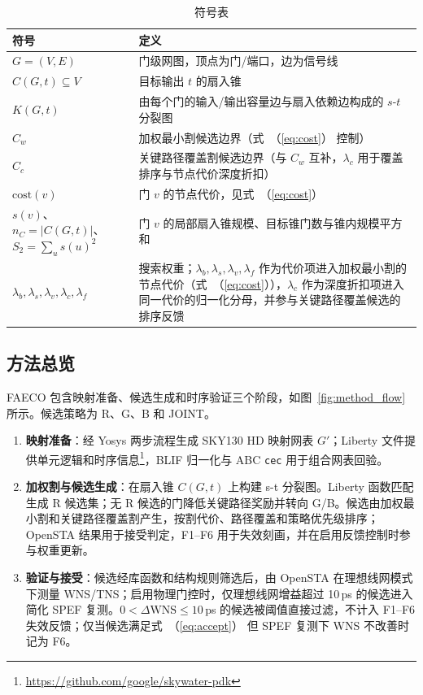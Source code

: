 \documentclass[twocolumn,10pt,fontset=windows]{ctexart}
\renewcommand{\eqref}[1]{\textup{（\ref{#1}）}}
\begin{document}
\begin{table}[ht]
\centering
\caption{符号表}
\label{tab:symbols}
\scriptsize
\setlength{\tabcolsep}{2pt}
\renewcommand{\arraystretch}{0.9}
\begin{tabular}{p{2.6cm}p{4.9cm}}
\toprule
\textbf{符号} & \textbf{定义} \\
\midrule
$G = (V, E)$ & 门级网图，顶点为门/端口，边为信号线 \\
$C(G, t) \subseteq V$ & 目标输出 $t$ 的扇入锥 \\
$K(G, t)$ & 由每个门的输入/输出容量边与扇入依赖边构成的 $s$-$t$ 分裂图 \\
$C_w$ & 加权最小割候选边界（式~\eqref{eq:cost} 控制） \\
$C_c$ & 关键路径覆盖割候选边界（与 $C_w$ 互补，$\lambda_c$ 用于覆盖排序与节点代价深度折扣） \\
$\mathrm{cost}(v)$ & 门 $v$ 的节点代价，见式~\eqref{eq:cost} \\
$s(v)$、$n_C=|C(G,t)|$、$S_2=\sum_u s(u)^2$ & 门 $v$ 的局部扇入锥规模、目标锥门数与锥内规模平方和 \\
$\lambda_b,\lambda_s,\lambda_v,\lambda_c,\lambda_f$ & 搜索权重；$\lambda_b,\lambda_s,\lambda_v,\lambda_f$ 作为代价项进入加权最小割的节点代价（式~\eqref{eq:cost}），$\lambda_c$ 作为深度折扣项进入同一代价的归一化分母，并参与关键路径覆盖候选的排序反馈 \\
\bottomrule
\end{tabular}
\end{table}

\subsection{方法总览}\label{sec:overview}

FAECO 包含映射准备、候选生成和时序验证三个阶段，如图~\ref{fig:method_flow} 所示。候选策略为 R、G、B 和 JOINT。

\begin{enumerate}
  \item[(a)] \textbf{映射准备}：经 Yosys 两步流程生成 SKY130 HD 映射网表 $G'$；Liberty 文件提供单元逻辑和时序信息\footnote{\url{https://github.com/google/skywater-pdk}}，BLIF 归一化与 ABC \texttt{cec}\cite{abc} 用于组合网表回验。
  \item[(b)] \textbf{加权割与候选生成}：在扇入锥 $C(G,t)$ 上构建 s-t 分裂图。Liberty 函数匹配生成 R 候选集；无 R 候选的门降低关键路径奖励并转向 G/B。候选由加权最小割和关键路径覆盖割产生，按割代价、路径覆盖和策略优先级排序；OpenSTA 结果用于接受判定，F1--F6 用于失效刻画，并在启用反馈控制时参与权重更新。
  \item[(c)] \textbf{验证与接受}：候选经库函数和结构规则筛选后，由 OpenSTA 在理想线网模式下测量 WNS/TNS；启用物理门控时，仅理想线网增益超过 10\,ps 的候选进入简化 SPEF 复测。$0<\Delta\mathrm{WNS}\le10\,$ps 的候选被阈值直接过滤，不计入 F1--F6 失效反馈；仅当候选满足式~\eqref{eq:accept} 但 SPEF 复测下 WNS 不改善时记为 F6。
\end{enumerate}
\end{document}
